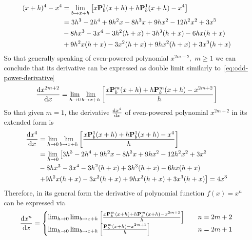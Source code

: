 \begin{equation*}
    \begin{split}
    (x+h)
        ^{4} - x^{4}
        &= \lim_{b \to x+h} \left[ x{\mathbf{P}}\sp{1} \sb{b}(x+h) + h{\mathbf{P}}\sp{1} \sb{b}(x+h)  - x^{4} \right] \\
        &= 3 h^3 - 2 h^4 + 9 h^2 x - 8 h^3 x + 9 h x^2 - 12 h^2 x^2 + 3 x^3 \\
        &- 8 h x^3 - 3 x^4 - 3 h^2 (h + x) + 3 h^3 (h + x) - 6 h x (h + x) \\
        &+ 9 h^2 x (h + x) - 3 x^2 (h + x) + 9 h x^2 (h + x) + 3 x^3 (h + x)
    \end{split}
\end{equation*}
So that generally speaking of even-powered polynomial $x^{2m+2}, \; m\geq 1$ we can conclude that its derivative
can be expressed as double limit similarly to~\eqref{eq:odd-power-derivative}
\begin{equation}
    \odv{x^{2m+2}}{x} =\lim_{h \to 0} \lim_{b \to x+h} \left[ \frac{x\polynomialP{m}{b}{x+h} + h\polynomialP{m}{b}{x+h}  - x^{2m+2}}{h} \right]
    \label{eq:even-power-derivative}
\end{equation}
So that given $m=1$, the derivative $\odv{x^4}{x}$ of even-powered polynomial $x^{2m+2}$ in its extended form is
\begin{equation*}
    \begin{split}
        \odv{x^4}{x}
        &= \lim_{h\to 0} \lim_{b \to x+h} \left[ \frac{x\polynomialP{1}{b}{x+h} + h\polynomialP{1}{b}{x+h}  - x^{4}}{h} \right] \\
        &= \lim_{h\to 0} \left[  3 h^3 - 2 h^4 + 9 h^2 x - 8 h^3 x + 9 h x^2 - 12 h^2 x^2 + 3 x^3 \right. \\
        &- 8 h x^3 - 3 x^4 - 3 h^2 (h + x) + 3 h^3 (h + x) - 6 h x (h + x) \\
        &\left. + 9 h^2 x (h + x) - 3 x^2 (h + x) + 9 h x^2 (h + x) + 3 x^3 (h + x) \right] = 4x^3
    \end{split}
\end{equation*}
Therefore, in its general form the derivative of polynomial function $f(x)=x^n$ can be expressed via
\begin{equation}
    \label{eq:polynomial-derivative-main-results}
    \odv{x^n}{x} =
    \begin{cases}
        \lim_{h \to 0} \lim_{b \to x+h} \left[ \frac{x\polynomialP{m}{b}{x+h} + h\polynomialP{m}{b}{x+h}  - x^{2m+2}}{h} \right] \quad &n=2m+2 \\
        \lim_{h \to 0} \lim_{b \to x+h} \left[ \frac{\polynomialP{m}{b}{x+h} - x^{2m+1}}{h} \right] \quad &n=2m+1
    \end{cases}
\end{equation}

